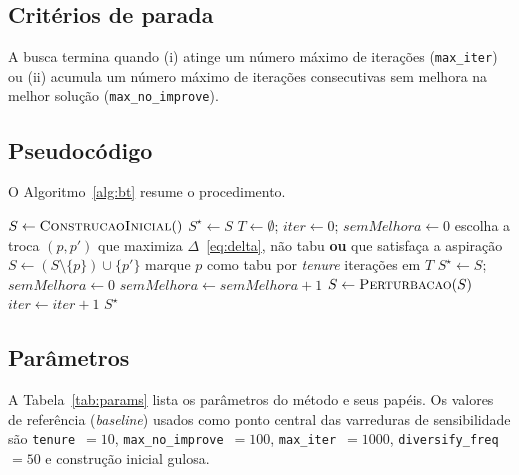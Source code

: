 \documentclass[a4paper,11pt]{article}
\begin{document}
\subsection{Critérios de parada}
A busca termina quando (i) atinge um número máximo de iterações (\texttt{max\_iter}) ou
(ii) acumula um número máximo de iterações consecutivas sem melhora na melhor solução
(\texttt{max\_no\_improve}).

\subsection{Pseudocódigo}
O Algoritmo~\ref{alg:bt} resume o procedimento.

\begin{algorithm}[t]
  \caption{Busca Tabu para o OMA}
  \label{alg:bt}
  \begin{algorithmic}[1]
    \State $S \gets \textsc{ConstrucaoInicial}()$ 
    \State $S^\star \gets S$ 
    \State $T \gets \emptyset$; \; $iter \gets 0$; \; $semMelhora \gets 0$
      \State escolha a troca $(p, p')$ que maximiza $\Delta$~\eqref{eq:delta}, não tabu
        \textbf{ou} que satisfaça a aspiração
      \State $S \gets (S \setminus \{p\}) \cup \{p'\}$
      \State marque $p$ como tabu por \emph{tenure} iterações em $T$
        \State $S^\star \gets S$; \; $semMelhora \gets 0$
      \Else
        \State $semMelhora \gets semMelhora + 1$
      \EndIf
        \State $S \gets \textsc{Perturbacao}(S)$
      \EndIf
      \State $iter \gets iter + 1$
    \EndWhile
    \State \Return $S^\star$
  \end{algorithmic}
\end{algorithm}

\subsection{Parâmetros}
A Tabela~\ref{tab:params} lista os parâmetros do método e seus papéis. Os valores de
referência (\emph{baseline}) usados como ponto central das varreduras de sensibilidade
são \texttt{tenure}~$=10$, \texttt{max\_no\_improve}~$=100$, \texttt{max\_iter}~$=1000$,
\texttt{diversify\_freq}~$=50$ e construção inicial gulosa.
\end{document}

